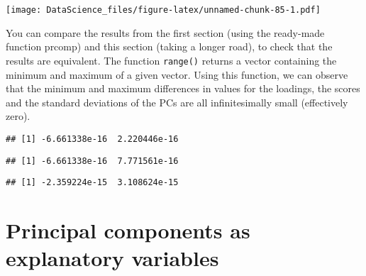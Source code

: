 \documentclass[
]{book}
\newenvironment{Shaded}{\begin{snugshade}}{\end{snugshade}}
\newcommand{\FunctionTok}[1]{\textcolor[rgb]{0.00,0.00,0.00}{#1}}
\newcommand{\NormalTok}[1]{#1}
\newcommand{\SpecialCharTok}[1]{\textcolor[rgb]{0.00,0.00,0.00}{#1}}
\begin{document}
\texttt{[image: DataScience\_files/figure-latex/unnamed-chunk-85-1.pdf]}

You can compare the results from the first section (using the ready-made function prcomp) and this section (taking a longer road), to check that the results are equivalent. The function \texttt{range()} returns a vector containing the minimum and maximum of a given vector. Using this function, we can observe that the minimum and maximum differences in values for the loadings, the scores and the standard deviations of the PCs are all infinitesimally small (effectively zero).

\begin{Shaded}
\end{Shaded}

\begin{verbatim}
## [1] -6.661338e-16  2.220446e-16
\end{verbatim}

\begin{Shaded}
\end{Shaded}

\begin{verbatim}
## [1] -6.661338e-16  7.771561e-16
\end{verbatim}

\begin{Shaded}
\end{Shaded}

\begin{verbatim}
## [1] -2.359224e-15  3.108624e-15
\end{verbatim}

\hypertarget{principal-components-as-explanatory-variables}{%
\section{Principal components as explanatory variables}\label{principal-components-as-explanatory-variables}}
\end{document}
